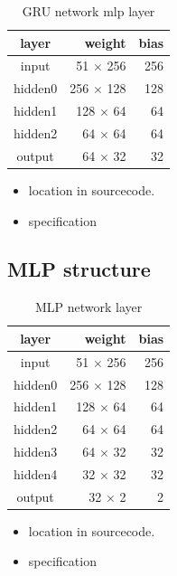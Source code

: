 \begin{table}[H]
\centering
\begin{tabular}{|c|r|r|}
\hline 
layer  & weight   & bias \\ \hline \hline
input  & 51 $\times$ 256 & 256  \\
hidden0 & 256 $\times$ 128 & 128 \\
hidden1 & 128 $\times$ 64  & 64  \\
hidden2 & 64 $\times$ 64   & 64  \\
output & 64 $\times$ 32   & 32  \\
\hline
\end{tabular} 
\caption{GRU network mlp layer}
\label{tab:reward_gru_mlp_network}
\end{table}


\begin{itemize}
\item location in sourcecode.
\item specification
\end{itemize}

\subsection{MLP structure}

\begin{table}[H]
\centering
\begin{tabular}{|c|r|r|}
\hline 
layer  & weight   & bias \\ \hline \hline
input  & 51 $\times$ 256 & 256  \\
hidden0 & 256 $\times$ 128 & 128 \\
hidden1 & 128 $\times$ 64  & 64  \\
hidden2 & 64 $\times$ 64   & 64  \\
hidden3 & 64 $\times$ 32   & 32  \\
hidden4 & 32 $\times$ 32   & 32  \\
output & 32 $\times$ 2    & 2  \\
\hline
\end{tabular} 
\caption{MLP network layer}
\label{tab:reward_mlp_network}
\end{table}






\begin{itemize}
\item location in sourcecode.
\item specification
\end{itemize}

